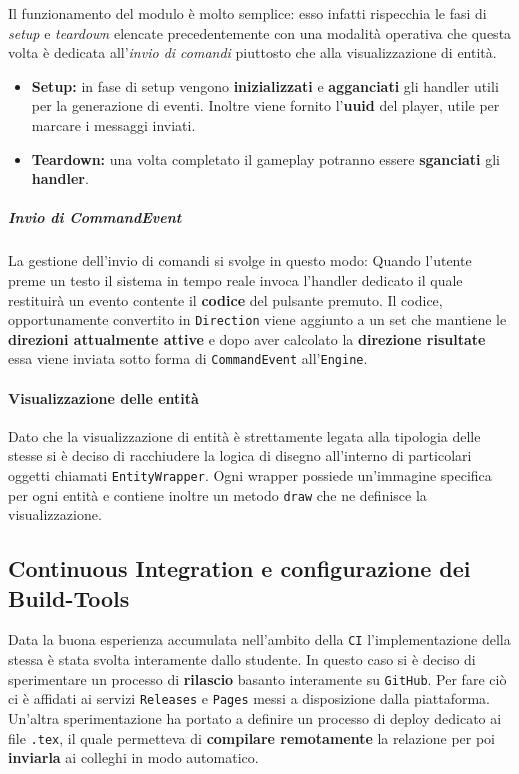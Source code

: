 

Il funzionamento del modulo è molto semplice: esso infatti rispecchia le fasi di \textit{setup} e \textit{teardown} elencate precedentemente con una modalità operativa che questa volta è dedicata all'\textit{invio di comandi} piuttosto che alla visualizzazione di entità.
\begin{itemize}
	\item{\textbf{Setup:}} in fase di setup vengono \textbf{inizializzati} e \textbf{agganciati} gli handler utili per la generazione di eventi. Inoltre viene fornito l'\textbf{uuid} del player, utile per marcare i messaggi inviati.
	\item{\textbf{Teardown:}} una volta completato il gameplay potranno essere \textbf{sganciati} gli \textbf{handler}.
\end{itemize}

\subparagraph{Invio di CommandEvent}
La gestione dell'invio di comandi si svolge in questo modo:
Quando l'utente preme un testo il sistema in tempo reale invoca l'handler dedicato il quale restituirà un evento contente il \textbf{codice} del pulsante premuto. Il codice, opportunamente convertito in \texttt{Direction} viene aggiunto a un set che mantiene le \textbf{direzioni attualmente attive} e dopo aver calcolato la \textbf{direzione risultate} essa viene inviata sotto forma di \texttt{CommandEvent} all'\texttt{Engine}.

\paragraph{Visualizzazione delle entità}
Dato che la visualizzazione di entità è strettamente legata alla tipologia delle stesse si è deciso di racchiudere la logica di disegno all'interno di particolari oggetti chiamati \texttt{EntityWrapper}. Ogni wrapper possiede un'immagine specifica per ogni entità e contiene inoltre un metodo \texttt{draw} che ne definisce la visualizzazione.

\subsection{Continuous Integration e configurazione dei Build-Tools}
\label{subsec:ci}
Data la buona esperienza accumulata nell'ambito della \texttt{CI} l'implementazione della stessa è stata svolta interamente dallo studente. In questo caso si è deciso di sperimentare un processo di \textbf{rilascio} basanto interamente su \texttt{GitHub}. Per fare ciò ci è affidati ai servizi \texttt{Releases} e \texttt{Pages} messi a disposizione dalla piattaforma. Un'altra sperimentazione ha portato a definire un processo di deploy dedicato ai file \texttt{.tex}, il quale permetteva di \textbf{compilare remotamente} la relazione per poi \textbf{inviarla} ai colleghi in modo automatico.

